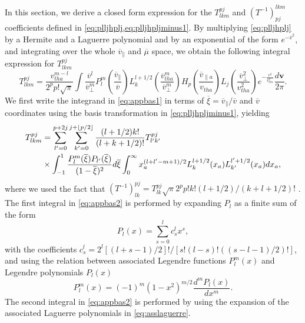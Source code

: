 In this section, we derive a closed form expression for the $T_{lkm}^{pj}$ and $(T^{-1})^{lkm}_{pj}$ coefficients defined in \cref{eq:plljhplj,eq:plljhpljminus1}.
%
By multiplying \cref{eq:plljhplj} by a Hermite and a Laguerre polynomial and by an exponential of the form $e^{-\overline v^2}$, and integrating over the whole $\overline v_\parallel$ and $\overline \mu$ space, we obtain the following integral expression for $T_{lkm}^{pj}$
%
\begin{equation}
    T_{lkm}^{pj}=\frac{v_{tha}^{m-l}}{2^p p! \sqrt{\pi}} \int \frac{\overline v^l}{\overline v_\perp^m} P_l^m\left(\frac{\overline v_\parallel}{\overline v}\right) L_k^{l+1/2}\left(\frac{\overline v_{tha}^m}{\overline v_\perp^m}\right) H_p\left(\frac{\overline v_{\parallel a}}{v_{tha}}\right)L_j\left(\frac{\overline v_\perp^2}{v_{tha}^2}\right) e^{-\frac{v^2}{v_{tha}^2}}\frac{d \bm v}{2 \pi}.
\label{eq:appbas1}
\end{equation}
%
We first write the integrand in \cref{eq:appbas1} in terms of $\overline \xi=\overline v_\parallel/\overline v$ and $\overline v$ coordinates using the basis transformation in \cref{eq:plljhpljminus1}, yielding
%
\begin{equation}
\begin{split}
     T_{lkm}^{pj}&= \sum_{l'=0}^{p+2j}\sum_{k'=0}^{j+\lfloor p/2\rfloor}\frac{(l+1/2)k!}{(l+k+1/2)!}T_{l'k'}^{pj}\\
     &\times\int_{-1}^1 \frac{P_l^m(\overline \xi) P_{l'}(\overline \xi)}{(1-\overline \xi)^2} d \overline \xi \int_0^\infty x_a^{(l+l'-m+1)/2}L_k^{l+1/2}(x_a)L_{k'}^{l'+1/2}(x_a) dx_a,
\end{split}
\label{eq:appbas2}
\end{equation}
%
where we used the fact that $(T^{-1})_{lk}^{pj}=T_{lk}^{pj}\sqrt{\pi}2^p p! k! (l+1/2)/(k+l+1/2)!$ \citep{Jorge2017}.
%
The first integral in \cref{eq:appbas2} is performed by expanding $P_{l}$ as a finite sum of the form
%
\begin{equation}
    P_{l}(x)=\sum_{s=0}^l c_s^l x^s,
\end{equation}
%
with the coefficients $c_s^l=2^l[(l+s-1)/2]!/[s!(l-s)!((s-l-1)/2)!]$, and using the relation between associated Legendre functions $P_l^m(x)$ and Legendre polynomials $P_l(x)$
%
\begin{equation}
    P_l^m(x) = (-1)^m(1-x^2)^{m/2}\frac{d^m P_l(x)}{dx^m}.
\end{equation}
%
The second integral in \cref{eq:appbas2} is performed by using the expansion of the associated Laguerre polynomials in \cref{eq:asslaguerre}.
